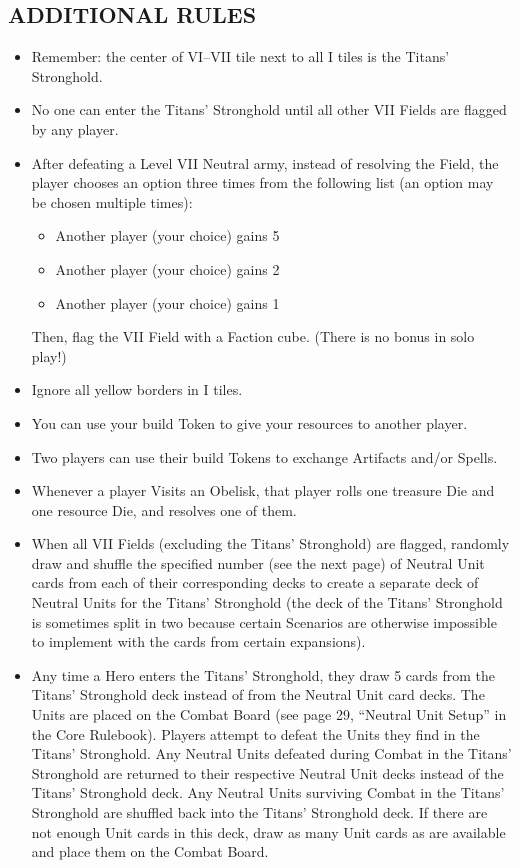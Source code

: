 \begin{multicols*}{2}
\subsection*{\MakeUppercase{Additional Rules}}
\begin{itemize}
  \item Remember: the center of VI--VII tile next to all I tiles is the Titans' Stronghold.
  \item No one can enter the Titans' Stronghold until all other VII Fields are flagged by any player.
  \item After defeating a Level VII Neutral army, instead of resolving the Field, the player chooses an option three times from the following list (an option may be chosen multiple times):
    \begin{itemize}
      \item Another player (your choice) gains 5\,
      \item Another player (your choice) gains 2\,
      \item Another player (your choice) gains 1\,
    \end{itemize}
  Then, flag the VII Field with a Faction cube.
  (There is no bonus in solo play!)
  \item Ignore all yellow borders in I tiles.
  \item You can use your build Token to give your resources to another player.
  \item Two players can use their build Tokens to exchange Artifacts and/or Spells.
  \item Whenever a player Visits an Obelisk, that player rolls one treasure Die and one resource Die, and resolves one of them.
  \item When all VII Fields (excluding the Titans' Stronghold) are flagged, randomly draw and shuffle the specified number (see the next page) of Neutral Unit cards from each of their corresponding decks to create a separate deck of Neutral Units for the Titans' Stronghold (the deck of the Titans' Stronghold is sometimes split in two because certain Scenarios are otherwise impossible to implement with the cards from certain expansions).
  \item Any time a Hero enters the Titans' Stronghold, they draw 5 cards from the Titans' Stronghold deck instead of from the Neutral Unit card decks. The Units are placed on the Combat Board (see page 29, ``Neutral Unit Setup'' in the Core Rulebook). Players attempt to defeat the Units they find in the Titans' Stronghold. Any Neutral Units defeated during Combat in the Titans' Stronghold are returned to their respective Neutral Unit decks instead of the Titans' Stronghold deck. Any Neutral Units surviving Combat in the Titans' Stronghold are shuffled back into the Titans' Stronghold deck. If there are not enough Unit cards in this deck, draw as many Unit cards as are available and place them on the Combat Board.

\end{itemize}
\end{multicols*}
